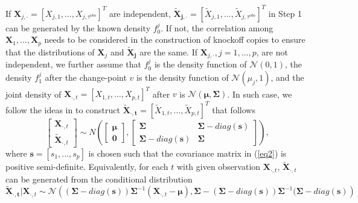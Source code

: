 \documentclass[a4paper,12pt]{article}
\begin{document}
If $\bm X_{j,\cdot} = [X_{j,1}, \ldots, X_{j,\tau^{obs}}]^T$ are independent, $\bm{\tilde X_{j,\cdot}} = [\tilde X_{j,1}, \ldots, \tilde X_{j,\tau^{obs}}]^T$ in Step 1 can be generated by the known density $f_0^j$. If not, the correlation among $\bm X_1, \ldots, \bm X_p$ needs to be considered in the construction of knockoff copies to ensure that the distributions of $\bm X_j$ and $\bm{\tilde X_j}$ are the same. If $\bm X_{j,\cdot}, j=1,\ldots,p$, are not independent, we further assume that $f^j_0$ is the density function of $\mathcal{N} (0,1)$, the density $f_1^j$ after the change-point $v$ is the density function of $\mathcal{N} (\mu_j, 1)$, and the joint density of $\bm X_{\cdot, t} = [X_{1,t}, \ldots, X_{p,t}]^T$ after $v$ is $\mathcal{N} (\bm \mu, \bm \Sigma)$. In such case, we follow the ideas in \cite{barber2015controlling} to construct $\bm{\tilde X_{\cdot, t}} = [\tilde X_{1,t}, \ldots, \tilde X_{p,t}]^T$ that follows 
\begin{equation} \label{eq2}
\begin{bmatrix}
\bm X_{\cdot,t} \\
\bm{\tilde X }_{\cdot,t}
\end{bmatrix}
\sim
N \left ( 
\begin{bmatrix}
\bm \mu \\
\bm 0
\end{bmatrix},
\begin{bmatrix} 
\bm \Sigma & \bm \Sigma - diag(\bm s) \\ 
\bm \Sigma - diag(\bm s) & \bm \Sigma 
\end{bmatrix}
\right),
\end{equation}
where $\bm s = [s_1, \ldots, s_p]$ is chosen such that the covariance matrix in (\ref{eq2}) is positive semi-definite. Equivalently, for each $t$ with given observation $\bm X_{\cdot, t}$, $\bm{\tilde X}_{\cdot, t}$ can be generated from the conditional distribution
\begin{equation}\label{eq3}
\bm{\tilde X_{\cdot, t}}|\bm X_{\cdot, t} \sim \mathcal{N}\left((\bm \Sigma - diag(\bm s))\bm \Sigma^{-1} (\bm X_{\cdot,t} - \bm \mu), \bm \Sigma - (\bm \Sigma-diag(\bm s))\bm \Sigma^{-1}(\bm \Sigma-diag(\bm s)\right)
\end{equation}
\end{document}
